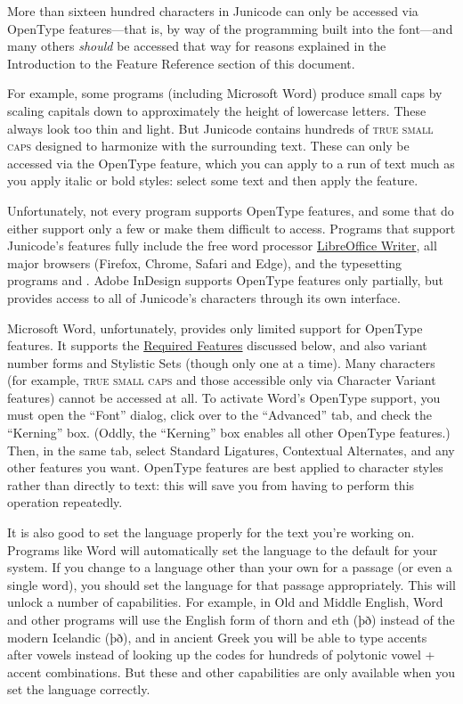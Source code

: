 More than sixteen hundred characters in Junicode can only be accessed via OpenType features—that is,
by way of the programming built into the font—and many others \textit{should} be
accessed that way for reasons explained in the Introduction
to the Feature Reference section of this document.

For example, some programs (including Microsoft Word) produce small caps by
scaling capitals down to approximately the height of lowercase letters.
These always look too thin and light.
But Junicode contains hundreds of \textsc{true small caps} designed to harmonize with
the surrounding text. These can only be accessed via the OpenType  feature,
which you can apply to a run of text much as you apply italic or bold styles:
select some text and then apply the feature.

Unfortunately, not every program supports OpenType features, and some that do
either support only a few or make them difficult to access. Programs
that support Junicode’s features fully include the free word processor
\href{https://www.libreoffice.org/}{LibreOffice Writer}, all major browsers
(Firefox, Chrome, Safari and Edge), and
the typesetting programs {\LuaLaTeX} and {\XeLaTeX}. Adobe InDesign supports
OpenType features only partially, but provides access to all of Junicode's characters
through its own interface.

Microsoft Word, unfortunately, provides only limited support for OpenType
features. It supports the \hyperlink{req}{Required Features} discussed below, and also
variant number forms and Stylistic Sets (though only one at a time). Many characters
(for example, \textsc{true small caps} and those accessible only via Character
Variant features) cannot be accessed at all. To activate Word's OpenType
support, you must open the “Font” dialog, click over to the “Advanced” tab,
and check the “Kerning” box. (Oddly, the “Kerning” box enables all other
OpenType features.) Then, in the same tab, select Standard Ligatures, Contextual
Alternates, and any other features you want.
OpenType features are best applied to character styles rather than
directly to text: this will
save you from having to perform this operation repeatedly.

It is also good to set the language properly for the text you're working on.
Programs like Word will automatically set the language to the default for your system. If you
change to a language other than your own for a passage (or even a single word),
you should set the language for that passage appropriately. This will unlock
a number of capabilities. For example, in Old and Middle English, Word and
other programs will use the English form of thorn and eth ({\eng þð}) instead of
the modern Icelandic ({\icel þð}), and in ancient
Greek you will be able to type accents after vowels instead of looking up
the codes for hundreds of polytonic vowel + accent combinations. But these and other capabilities
are only available when you set the language correctly.

